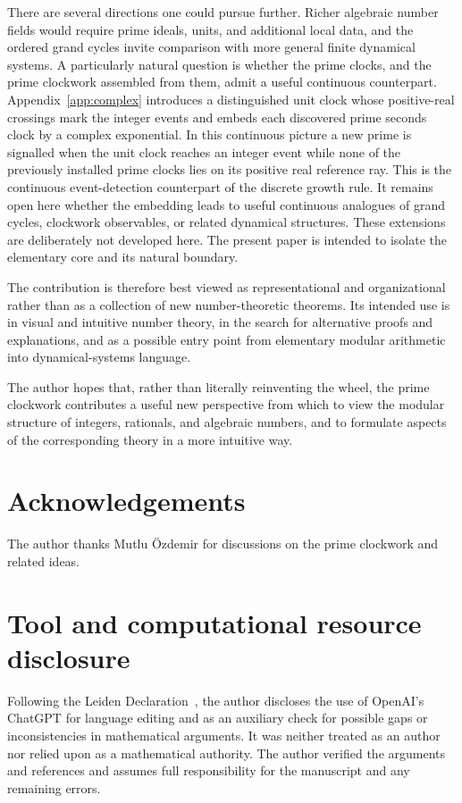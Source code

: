 \documentclass[11pt,a4paper]{article}
\theoremstyle{clockplain}
\theoremstyle{definition}
\theoremstyle{remark}
\begin{document}
There are several directions one could pursue further. Richer algebraic number fields would require prime ideals, units, and additional local data, and the ordered grand cycles invite comparison with more general finite dynamical systems. A particularly natural question is whether the prime clocks, and the prime clockwork assembled from them, admit a useful continuous counterpart. Appendix~\ref{app:complex} introduces a distinguished unit clock whose positive-real crossings mark the integer events and embeds each discovered prime seconds clock by a complex exponential. In this continuous picture a new prime is signalled when the unit clock reaches an integer event while none of the previously installed prime clocks lies on its positive real reference ray. This is the continuous event-detection counterpart of the discrete growth rule. It remains open here whether the embedding leads to useful continuous analogues of grand cycles, clockwork observables, or related dynamical structures. These extensions are deliberately not developed here. The present paper is intended to isolate the elementary core and its natural boundary.

The contribution is therefore best viewed as representational and organizational rather than as a collection of new number-theoretic theorems. Its intended use is in visual and intuitive number theory, in the search for alternative proofs and explanations, and as a possible entry point from elementary modular arithmetic into dynamical-systems language.

The author hopes that, rather than literally reinventing the wheel, the prime clockwork contributes a useful new perspective from which to view the modular structure of integers, rationals, and algebraic numbers, and to formulate aspects of the corresponding theory in a more intuitive way.

\section*{Acknowledgements}
The author thanks Mutlu \"Ozdemir for discussions on the prime clockwork and related ideas.

\section*{Tool and computational resource disclosure}
Following the Leiden Declaration~\cite{LeidenDeclaration2026}, the author discloses the use of OpenAI's ChatGPT for language editing and as an auxiliary check for possible gaps or inconsistencies in mathematical arguments. It was neither treated as an author nor relied upon as a mathematical authority. The author verified the arguments and references and assumes full responsibility for the manuscript and any remaining errors.
\end{document}
